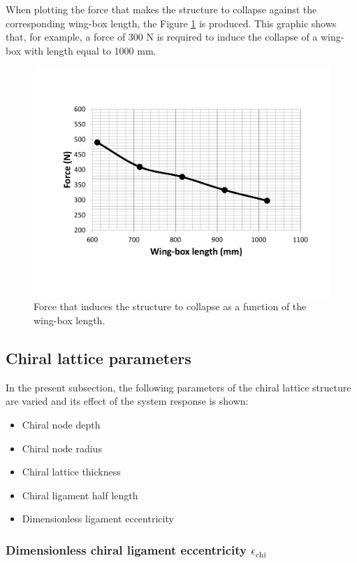     When plotting the force that makes the structure to collapse against the corresponding wing-box length, the Figure \ref{fig:force_N} is produced. This graphic shows that, for example, a force of 300 N is required to induce the collapse of a wing-box with length equal to 1000 mm.

    \begin{figure}[!htpb] %
      \centering
      \includegraphics[width=0.8 \textwidth]{figures/result-sim/N/force_N}
      \caption[Force that induces the structure to collapse as a function of the wing-box length]{Force that induces the structure to collapse as a function of the wing-box length.}\label{fig:force_N}
    \end{figure}

  \clearpage
  \subsection{Chiral lattice parameters} \label{subsec:chiral_para}

    In the present subsection, the following parameters of the chiral lattice structure are varied and its effect of the system response is shown:
    \begin{itemize}
      \item Chiral node depth \chiB
      \item Chiral node radius \chir
      \item Chiral lattice thickness \chit
      \item Chiral ligament half length \chiL
      \item Dimensionless ligament eccentricity \chie
    \end{itemize}

    \subsubsection{Dimensionless chiral ligament eccentricity $\epsilon_{\mathrm{chi}}$}


